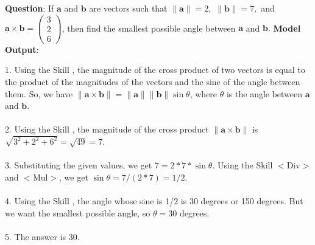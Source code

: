 \documentclass{article} %
\begin{document}
\begin{tcolorbox}[title = {MATH}, colback = Apricot!25!white, colframe = BrickRed!75!black] 
\textbf{Question}: If $\mathbf{a}$ and $\mathbf{b}$ are vectors such that $\|\mathbf{a}\| = 2,$ $\|\mathbf{b}\| = 7,$ and $\mathbf{a} \times \mathbf{b} = \begin{pmatrix} 3 \\ 2 \\ 6 \end{pmatrix}$, then find the smallest possible angle between $\mathbf{a}$ and $\mathbf{b}.$ 
\tcblower
\textbf{Model Output}:


\quad


1. Using the Skill , the magnitude of the cross product of two vectors is equal to the  product of the magnitudes of the vectors and the sine of the angle between them. So, we have  $\|\mathbf{a} \times \mathbf{b}\| = \|\mathbf{a}\|\|\mathbf{b}\|\sin \theta$, where $\theta$ is the angle between $\mathbf{a}$ and $\mathbf{b}$. \\ \\
2. Using the Skill , the magnitude of the cross product $\|\mathbf{a} \times \mathbf{b}\|$ is $\sqrt{3^2 + 2^2 + 6^2} = \sqrt{49} = 7$. \\ \\
3. Substituting the given values, we get $7 = 2*7*\sin \theta$. Using the Skill $<$Div$>$ and $<$Mul$>$, we get $\sin \theta = 7/(2*7) = 1/2$. \\ \\
4. Using the Skill , the angle whose sine is 1/2 is 30 degrees or 150 degrees. But we want the smallest possible angle, so $\theta = 30$ degrees. \\ \\
5. The answer is 30. 
\end{tcolorbox}
\noindent\begin{minipage}{\textwidth}
 \label{Tab:example_compose_math_skill_4}
\end{minipage}
\end{document}
